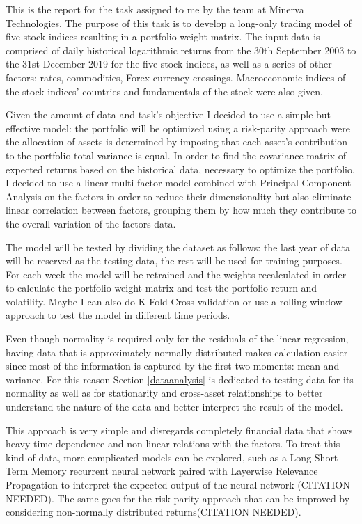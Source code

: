 


This is the report for the task assigned to me by the team at Minerva Technologies. The purpose of this task is to develop a long-only trading model of five stock indices resulting in a portfolio weight matrix. The input data is comprised of daily historical logarithmic returns from the 30th September 2003 to the 31st December 2019 for the five stock indices, as well as a series of other factors: rates, commodities, Forex currency crossings. Macroeconomic indices of the stock indices' countries and fundamentals of the stock were also given.

Given the amount of data and task's objective I decided to use a simple but effective model: the portfolio will be optimized using a risk-parity approach were the allocation of assets is determined by imposing that each asset's contribution to the portfolio total variance is equal. In order to find the covariance matrix of expected returns based on the historical data, necessary to optimize the portfolio, I decided to use a linear multi-factor model combined with Principal Component Analysis on the factors in order to reduce their dimensionality but also eliminate linear correlation between factors, grouping them by how much they contribute to the overall variation of the factors data.

The model will be tested by dividing the dataset as follows: the last year of data will be reserved as the testing data, the rest will be used for training purposes.
For each week the model will be retrained and the weights recalculated in order to calculate the portfolio weight matrix and test the portfolio return and volatility.
Maybe I can also do K-Fold Cross validation or use a rolling-window approach to test the model in different time periods. 

Even though normality is required only for the residuals of the linear regression, having data that is approximately normally distributed makes calculation easier since most of the information is captured by the first two moments: mean and variance. For this reason Section \ref{dataanalysis} is dedicated to testing data for its normality as well as for stationarity and cross-asset relationships to better understand the nature of the data and better interpret the result of the model.

This approach is very simple and disregards completely financial data that shows heavy time dependence and non-linear relations with the factors. To treat this kind of data, more complicated models can be explored, such as a Long Short-Term Memory recurrent neural network paired with Layerwise Relevance Propagation to interpret the expected output of the neural network (CITATION NEEDED). The same goes for the risk parity approach that can be improved by considering non-normally distributed returns(CITATION NEEDED).
